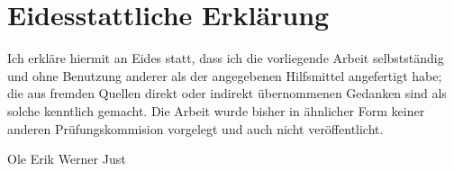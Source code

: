 \section{Eidesstattliche Erklärung}

Ich erkläre hiermit an Eides statt, dass ich die vorliegende Arbeit
selbstständig und ohne Benutzung anderer als der angegebenen Hilfsmittel
angefertigt habe; die aus fremden Quellen direkt oder indirekt übernommenen
Gedanken sind als solche kenntlich gemacht. Die Arbeit wurde bisher in ähnlicher
Form keiner anderen Prüfungskommision vorgelegt und auch nicht veröffentlicht.

\bigskip
\bigskip
\bigskip
\bigskip
	
\begin{multicols}{2}
  \raggedright
  
  
  \raggedleft
  Ole Erik Werner Just
\end{multicols}
